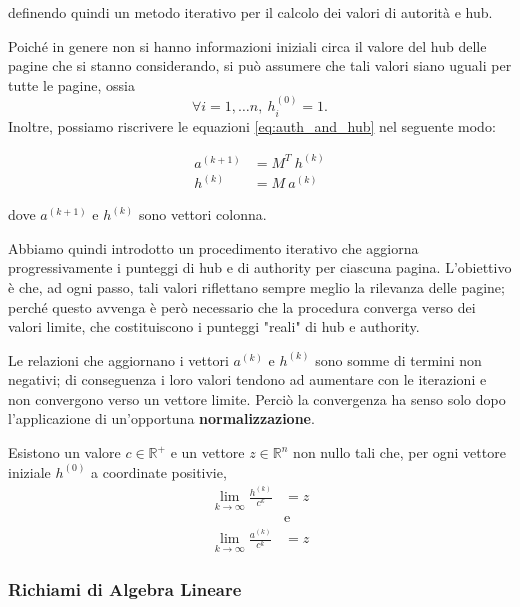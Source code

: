 definendo quindi un metodo iterativo per il calcolo dei valori di autorità e hub.

Poiché in genere non si hanno informazioni iniziali circa il valore del hub delle pagine che si stanno considerando, si può assumere che tali valori siano uguali per tutte le pagine, ossia
\[
\forall i = 1, \dots n,\ h_i^{(0)} = 1.
\]
Inoltre, possiamo riscrivere le equazioni \eqref{eq:auth_and_hub} nel seguente modo:

\begin{equation}
\begin{split}
    a^{(k+1)} &= M^T\ h^{(k)} \\
    h^{(k)} &= M\ a^{(k)}
\end{split}
\end{equation}

dove $a^{(k+1)}$ e $h^{(k)}$ sono vettori colonna.

Abbiamo quindi introdotto un procedimento iterativo che aggiorna progressivamente i punteggi di hub e di authority per ciascuna pagina. L'obiettivo è che, ad ogni passo, tali valori riflettano sempre meglio la rilevanza delle pagine; perché questo avvenga è però necessario che la procedura converga verso dei valori limite, che costituiscono i punteggi "reali" di hub e authority.

Le relazioni che aggiornano i vettori $a^{(k)}$ e $h^{(k)}$ sono somme di termini non negativi; di conseguenza i loro valori tendono ad aumentare con le iterazioni e non convergono verso un vettore limite. Perciò la convergenza ha senso solo dopo l'applicazione di un'opportuna \textbf{normalizzazione}.

\begin{teorema}
    Esistono un valore $c \in \mathbb{R}^+$ e un vettore $z \in \mathbb{R}^n$ non nullo tali che, per ogni vettore iniziale $h^{(0)}$ a coordinate positivie,
    \begin{equation}
    \begin{split}
        \lim_{k \to \infty} \frac{h^{(k)}}{c^k} &= z \\
        &\text{e} \\
        \lim_{k \to \infty} \frac{a^{(k)}}{c^k} &= z
    \end{split}
    \end{equation}
\end{teorema}

\subsubsection{Richiami di Algebra Lineare}

